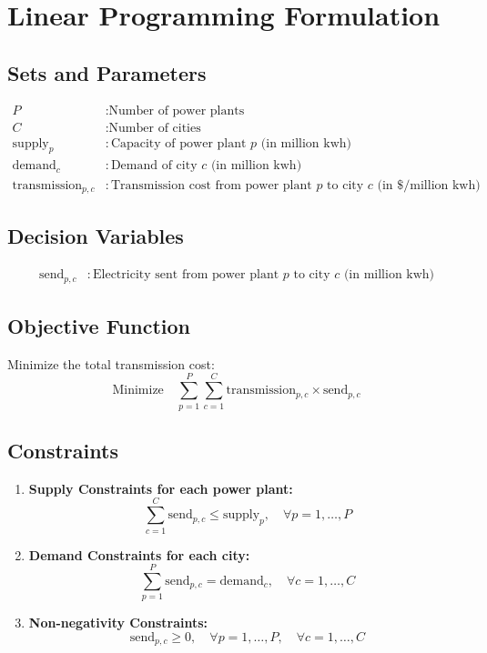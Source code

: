\documentclass{article}
\begin{document}
\section*{Linear Programming Formulation}

\subsection*{Sets and Parameters}
\begin{align*}
P & : \text{Number of power plants} \\
C & : \text{Number of cities} \\
\text{supply}_p & : \text{Capacity of power plant } p \text{ (in million kwh)} \\
\text{demand}_c & : \text{Demand of city } c \text{ (in million kwh)} \\
\text{transmission}_{p,c} & : \text{Transmission cost from power plant } p \text{ to city } c \text{ (in \$/million kwh)}
\end{align*}

\subsection*{Decision Variables}
\begin{align*}
\text{send}_{p,c} & : \text{Electricity sent from power plant } p \text{ to city } c \text{ (in million kwh)}
\end{align*}

\subsection*{Objective Function}
Minimize the total transmission cost:
\[
\text{Minimize} \quad \sum_{p=1}^{P} \sum_{c=1}^{C} \text{transmission}_{p,c} \times \text{send}_{p,c}
\]

\subsection*{Constraints}
\begin{enumerate}
    \item \textbf{Supply Constraints for each power plant:}
    \[
    \sum_{c=1}^{C} \text{send}_{p,c} \leq \text{supply}_{p}, \quad \forall p = 1, \ldots, P
    \]
    
    \item \textbf{Demand Constraints for each city:}
    \[
    \sum_{p=1}^{P} \text{send}_{p,c} = \text{demand}_{c}, \quad \forall c = 1, \ldots, C
    \]
    
    \item \textbf{Non-negativity Constraints:}
    \[
    \text{send}_{p,c} \geq 0, \quad \forall p = 1, \ldots, P, \quad \forall c = 1, \ldots, C
    \]
\end{enumerate}
\end{document}

